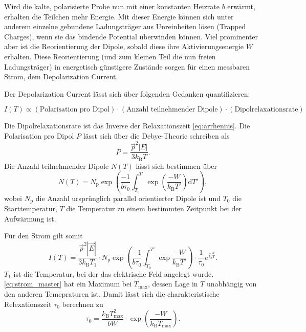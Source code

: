 Wird die kalte, polarisierte Probe nun mit einer konstanten Heizrate $b$ erwärmt, erhalten die Teilchen mehr Energie. Mit dieser Energie können sich unter anderem einzelne gebundene Ladungsträger aus Unreinheiten lösen (Trapped Charges), wenn sie
das bindende Potential überwinden können. Viel prominenter aber ist die Reorientierung der Dipole, sobald diese ihre Aktivierungsenergie $W$ erhalten. Diese Reorientierung (und zum kleinen Teil die nun freien Ladungsträger) in energetisch günstigere Zustände
sorgen für einen messbaren Strom, dem Depolarization Current.

Der Depolarization Current lässt sich über folgenden Gedanken quantifizieren:

\begin{equation*}
    I\left(T\right) \propto \left(\text{Polarisation pro Dipol}\right) \cdot \left(\text{Anzahl teilnehmender Dipole}\right) \cdot \left(\text{Dipolrelaxationsrate}\right)
\end{equation*}

Die Dipolrelaxationsrate ist das Inverse der Relaxationszeit \ref{eq:arrhenius}. Die Polarisation pro Dipol $P$ lässt sich über die Debye-Theorie schreiben als
\begin{equation}
    P = \frac{\vec{p}^2 \left\lvert E \right\rvert}{3 k_\text{B} T}.
    \label{eq:polarisation}
\end{equation}
Die Anzahl teilnehmender Dipole $N\left(T\right)$ lässt sich bestimmen über
\begin{equation}
    N\left(T\right) = N_\text{p} \exp\left(\frac{-1}{b\tau_0} \int_{T_0}^{T'} \exp\left(\frac{-W}{k_\text{B}T'}\right)\mathrm{d}T'\right),
    \label{eq:dipolanzahl}
\end{equation}
wobei $N_\text{p}$ die Anzahl ursprünglich parallel orientierter Dipole ist und $T_0$ die Starttemperatur, $T$ die Temperatur zu einem bestimmten Zeitpunkt bei der Aufwärmung ist.

Für den Strom gilt somit
\begin{equation}
    I\left(T\right) = \frac{\vec{p}^2 \left\lvert \vec{E} \right\rvert}{3 k_\text{B} T_1} \cdot N_\text{p} \exp\left(\frac{-1}{b\tau_0} \int_{T_0}^{T'} \exp{\frac{-W}{k_\text{B}T'}}\right) \cdot \frac{1}{\tau_0} e^{\frac{-W}{k_\text{B}T}}.
    \label{eq:strom_master}
\end{equation}
$T_1$ ist die Temperatur, bei der das elektrische Feld angelegt wurde.
\autoref{eq:strom_master} hat ein Maximum bei $T_\text{max}$, dessen Lage in $T$ unabhängig von den anderen Temepraturen ist.
Damit lässt sich die charakteristische Relexationszeit $\tau_0$ berechnen zu
\begin{equation}
    \tau_0 = \frac{k_\text{B}T_\text{max}^2}{bW} \cdot \exp\left(\frac{-W}{k_\text{B}T_\text{max}}\right).
    \label{eq:tau0_maximum}
\end{equation}



